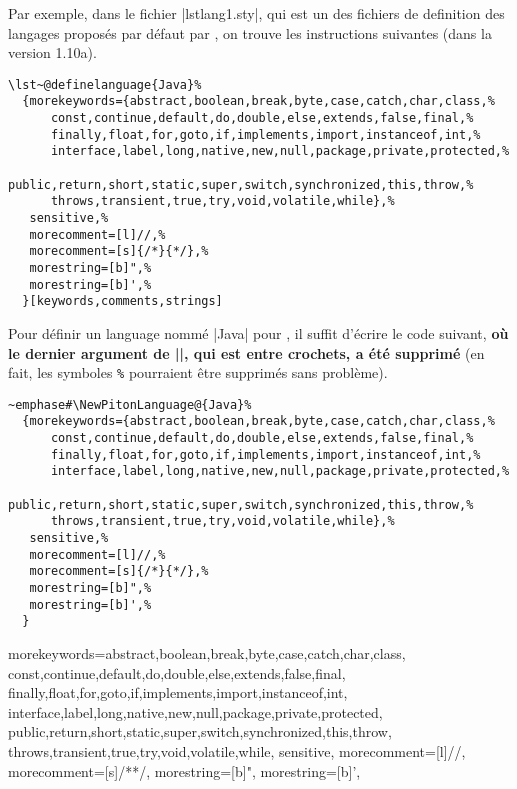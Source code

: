 \documentclass[dvipsnames,svgnames]{article}
\begin{document}
\medskip
Par exemple, dans le fichier |lstlang1.sty|, qui est un des fichiers de definition des
langages proposés par défaut par , on trouve les instructions suivantes
(dans la version 1.10a).

\begin{Verbatim}[formatcom=\small\color{gray}]
\lst~@definelanguage{Java}%
  {morekeywords={abstract,boolean,break,byte,case,catch,char,class,%
      const,continue,default,do,double,else,extends,false,final,%
      finally,float,for,goto,if,implements,import,instanceof,int,%
      interface,label,long,native,new,null,package,private,protected,%
      public,return,short,static,super,switch,synchronized,this,throw,%
      throws,transient,true,try,void,volatile,while},%
   sensitive,%
   morecomment=[l]//,%
   morecomment=[s]{/*}{*/},%
   morestring=[b]",%
   morestring=[b]',%
  }[keywords,comments,strings]
\end{Verbatim}

\medskip
Pour définir un language nommé |Java| pour , il suffit d'écrire le code
suivant, {\bfseries où le dernier argument de |\lst@definelanguage|, qui est entre
  crochets, a été supprimé} (en fait, les symboles \verb+%+ pourraient être supprimés sans
problème).

\begin{Verbatim}[formatcom=\small\color{gray}]
~emphase#\NewPitonLanguage@{Java}%
  {morekeywords={abstract,boolean,break,byte,case,catch,char,class,%
      const,continue,default,do,double,else,extends,false,final,%
      finally,float,for,goto,if,implements,import,instanceof,int,%
      interface,label,long,native,new,null,package,private,protected,%
      public,return,short,static,super,switch,synchronized,this,throw,%
      throws,transient,true,try,void,volatile,while},%
   sensitive,%
   morecomment=[l]//,%
   morecomment=[s]{/*}{*/},%
   morestring=[b]",%
   morestring=[b]',%
  }
\end{Verbatim}


  {morekeywords={abstract,boolean,break,byte,case,catch,char,class,
      const,continue,default,do,double,else,extends,false,final,
      finally,float,for,goto,if,implements,import,instanceof,int,
      interface,label,long,native,new,null,package,private,protected,
      public,return,short,static,super,switch,synchronized,this,throw,
      throws,transient,true,try,void,volatile,while},
   sensitive,
   morecomment=[l]//,
   morecomment=[s]{/*}{*/},
   morestring=[b]",
   morestring=[b]',
  }
\end{document}

